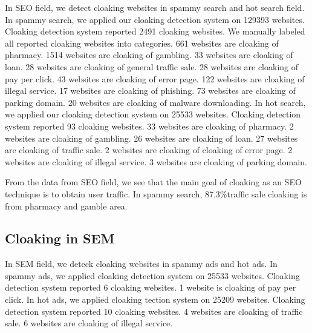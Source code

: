 In SEO field, we detect cloaking websites in spammy search and hot search field. In spammy search,
we applied our cloaking detection system on 129393 websites. Cloaking detection system reported 2491
cloaking websites. We manually labeled all reported cloaking websites into categories.
661 websites are cloaking of pharmacy. 1514 websites are cloaking of gambling.
33 websites are cloaking of loan. 28 websites are cloaking of general traffic sale. 28 websites are cloaking
of pay per click. 43 websites are cloaking of error page. 122 websites are cloaking of illegal service. 
17 websites are cloaking of phishing. 73 websites are cloaking of parking domain. 20 websites are cloaking of malware downloading.
In hot search, we applied our cloaking detection system on 25533 websites. Cloaking detection system reported 93
cloaking websites. 33 websites are cloaking of pharmacy. 2 websites are cloaking of gambling.
26 websites are cloaking of loan. 27 websites are cloaking of traffic sale. 2 websites are cloaking of cloaking of
error page. 2 websites are cloaking of illegal service. 3 websites are cloaking of parking domain.

From the data from SEO field, we see that the main goal of cloaking as an SEO technique is to obtain user traffic.
In spammy search, 87.3\%traffic sale cloaking is from pharmacy and gamble area. 






%
%
%


\subsection{Cloaking in SEM}

In SEM field, we deteck cloaking websites in spammy ads and hot ads. In spammy ads,
we applied cloaking detection system on 25533 websites. Cloaking detection system reported 6 cloaking websites.
1 website is cloaking of pay per click. In hot ads, we applied cloaking tection system on 25209 websites.
Cloaking detection system reported 10 cloaking websites. 4 websites are cloaking of traffic sale.
6 websites are cloaking of illegal service. 

